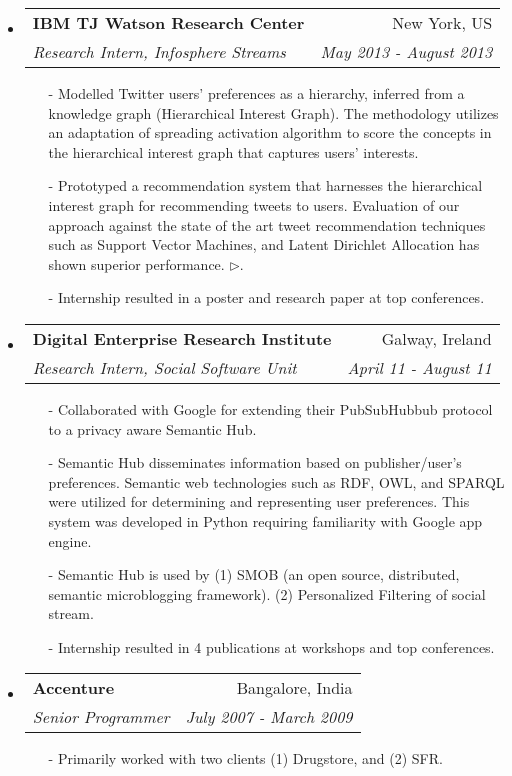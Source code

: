 \documentclass[letterpaper,9pt]{article}
\makeatletter
\newcommand{\ressubheading}[4]{
\begin{tabular*}{7.0in}{l@{\extracolsep{\fill}}r}
		\textbf{#1} & #2 \\
		\textit{#3} & \textit{#4} \\
\end{tabular*}\vspace{-6pt}}
\makeatother
\begin{document}
\begin{itemize}
\item 
\ressubheading{IBM TJ Watson Research Center}{New York, US}{Research Intern, Infosphere Streams}{May 2013 - August 2013} 
\begin{itemize}
\item[-] Modelled Twitter users' preferences as a hierarchy, inferred from a knowledge graph (Hierarchical Interest Graph). The methodology utilizes an adaptation of spreading activation algorithm to score the concepts in the hierarchical interest graph that captures users' interests. 
\item[-] Prototyped a recommendation system that harnesses the hierarchical interest graph for recommending tweets to users. Evaluation of our approach against the state of the art tweet recommendation techniques such as Support Vector Machines, and Latent Dirichlet Allocation has shown superior performance.  \href{http://wiki.knoesis.org/index.php/Hierarchical_Interest_Graph}{$\triangleright$}.
\item[-] Internship resulted in a poster and research paper at top conferences. 
\end{itemize}

\item
	\ressubheading{Digital Enterprise Research Institute}{Galway, Ireland}{Research Intern, Social Software Unit}{April 11 - August 11}
\begin{itemize}
\item[-] Collaborated with Google for extending their PubSubHubbub protocol to a privacy aware Semantic Hub. 
\item[-] Semantic Hub disseminates information based on publisher/user's preferences. Semantic web technologies such as RDF, OWL, and SPARQL were utilized for determining and representing user preferences. This system was developed in Python requiring familiarity with Google app engine. 
\item[-] Semantic Hub is used by (1) SMOB (an open source, distributed, semantic microblogging framework). (2) Personalized Filtering of social stream.
\item[-] Internship resulted in 4 publications at workshops and top conferences. 
\end{itemize}

\item
\ressubheading{Accenture}{Bangalore, India}{Senior Programmer}{July 2007 - March 2009}
\begin{itemize}
\item[-]Primarily worked with two clients (1) Drugstore, and (2) SFR. 


\end{itemize}
\end{itemize}
\end{document}
